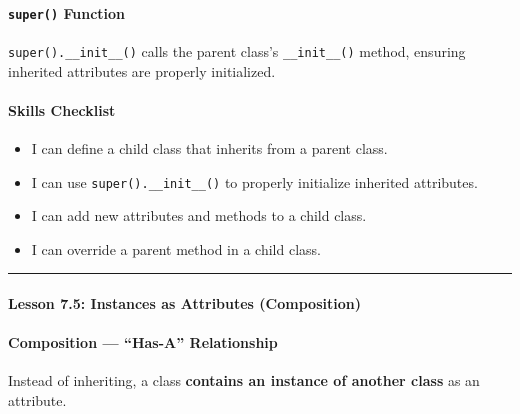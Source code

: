 \documentclass[
  justified,
  openright,
]{tufte-book}
\let\subsection\paragraph
\let\paragraph\paragraph
\let\subsection\paragraph
\let\paragraph\paragraph
\providecommand{\tightlist}{%
  \setlength{\itemsep}{0pt}\setlength{\parskip}{0pt}}
\begin{document}
\subsection{\texorpdfstring{\texttt{super()}
Function}{super() Function}}\label{super-function}

\texttt{super().\_\_init\_\_()} calls the parent class's
\texttt{\_\_init\_\_()} method, ensuring inherited attributes are
properly initialized.

\subsection{Skills Checklist}\label{skills-checklist-35}

\begin{itemize}
\tightlist
\item[$\square$]
  I can define a child class that inherits from a parent class.
\item[$\square$]
  I can use \texttt{super().\_\_init\_\_()} to properly initialize
  inherited attributes.
\item[$\square$]
  I can add new attributes and methods to a child class.
\item[$\square$]
  I can override a parent method in a child class.
\end{itemize}

\begin{center}\rule{0.5\linewidth}{0.5pt}\end{center}

\subsection{Lesson 7.5: Instances as Attributes
(Composition)}\label{lesson-7.5-instances-as-attributes-composition}

\subsection{Composition --- ``Has-A''
Relationship}\label{composition-has-a-relationship}

Instead of inheriting, a class \textbf{contains an instance of another
class} as an attribute.
\end{document}
